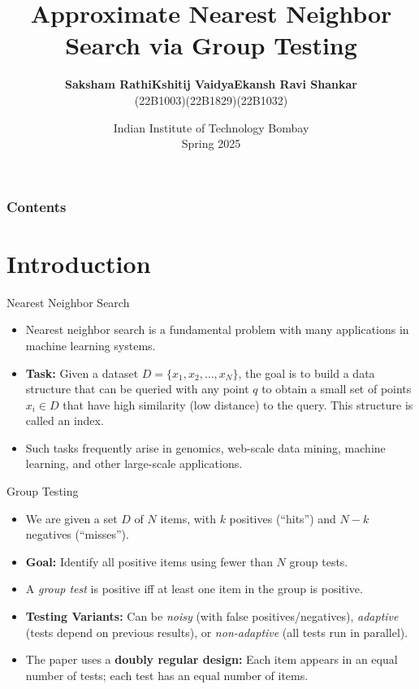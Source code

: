 \documentclass[Serif, 10pt, brown]{beamer}
\title[{Approximate Nearest Neighbor Search via Group Testing}]{\sc Approximate Nearest Neighbor Search via Group Testing}
\author[\ul{Authors}]{
  \begin{tabular}{c c c}
    {\bf Saksham Rathi} & {\bf Kshitij Vaidya} & {\bf Ekansh Ravi Shankar} \\
    (22B1003) & (22B1829) & (22B1032)
  \end{tabular}
}
\institute[UTD]{\sc\small CS754: Advanced Image Processing\\ Under Prof. Ajit Rajwade}
\date[UCI]{Indian Institute of Technology Bombay \\ Spring 2025}
\theoremstyle{example}
\theoremstyle{plain}
\begin{document}
\frame{\titlepage}
%
%


\begin{frame}
	\transblindsvertical
	\frametitle{Contents}
	\tableofcontents[hidesubsections]
\end{frame}

\section{Introduction}
\begin{frame}{Nearest Neighbor Search}
	\begin{itemize}
		\item Nearest neighbor search is a fundamental problem with many applications in machine learning systems.
		\item {\bf Task:} Given a dataset $D = \{x_1, x_2, \dots , x_N\}$, the goal is to build a data structure that can be queried with any point $q$ to obtain a small set of points $x_i \in D$ that have high similarity (low distance) to the query. This structure is called an index.
		\item Such tasks frequently arise in genomics, web-scale data mining,
		machine learning, and other large-scale applications.
	\end{itemize}
\end{frame}

\begin{frame}{Group Testing}
	\begin{itemize}
		\item We are given a set $D$ of $N$ items, with $k$ positives (“hits”) and $N-k$ negatives (“misses”).
		\item \textbf{Goal:} Identify all positive items using fewer than $N$ group tests.
		\item A \textit{group test} is positive iff at least one item in the group is positive.
		\item \textbf{Testing Variants:} Can be \textit{noisy} (with false positives/negatives), \textit{adaptive} (tests depend on previous results), or \textit{non-adaptive} (all tests run in parallel).
		\item The paper uses a \textbf{doubly regular design:} Each item appears in an equal number of tests; each test has an equal number of items.
	\end{itemize}
\end{frame}
\end{document}
